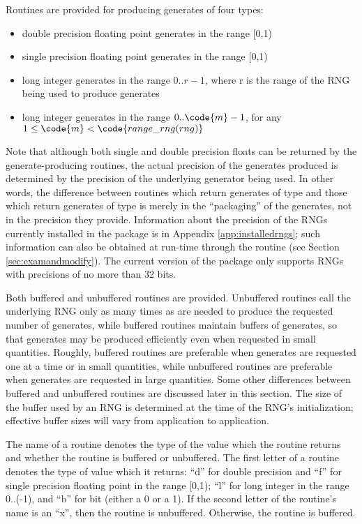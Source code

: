 Routines are provided for producing generates of four types:
\begin{tex}
\begin{itemize}
\item{double precision floating point generates in the range [0,1)}
\item{single precision floating point generates in the range [0,1)}
\item{long integer generates in the range $0..r-1$, where r is the range
of the RNG being used to produce generates}
\item{long integer generates in the range $0..\code{m}-1$, for any $1
\leq \code{m} < \code{range\_rng(rng)}$}
\end{itemize}
\end{tex}

Note that although both single and double precision floats can be
returned by the generate-producing routines, the actual precision of the
generates produced is determined by the precision of the underlying
generator being used.  In other words, the difference between routines
which return generates of type  and those which return
generates of type  is merely in the ``packaging'' of the
generates, not in the precision they provide.  Information about the
precision of the RNGs currently installed in the package is in Appendix
\ref{app:installedrngs}; such information can also be obtained at
run-time through the  routine (see Section
\ref{sec:examandmodify}).  The current version of the package only
supports RNGs with precisions of no more than 32 bits.

Both buffered and unbuffered routines are provided.  Unbuffered routines
call the underlying RNG only as many times as are needed to produce the
requested number of generates, while buffered routines maintain buffers
of generates, so that generates may be produced efficiently even when
requested in small quantities.  Roughly, buffered routines are
preferable when generates are requested one at a time or in small
quantities, while unbuffered routines are preferable when generates are
requested in large quantities.  Some other differences between buffered
and unbuffered routines are discussed later in this section.  The size
of the buffer used by an RNG is determined at the time of the RNG's
initialization; effective buffer sizes will vary from application to
application.

The name of a routine denotes the type of the value which the routine
returns and whether the routine is buffered or unbuffered. The first
letter of a routine denotes the type of value which it returns: ``d''
for double precision and ``f'' for single precision floating point in
the range [0,1); ``l'' for long integer in the range
0..(-1), and ``b'' for bit (either a 0 or a 1).  If
the second letter of the routine's name is an ``x'', then the routine is
unbuffered.  Otherwise, the routine is buffered.

